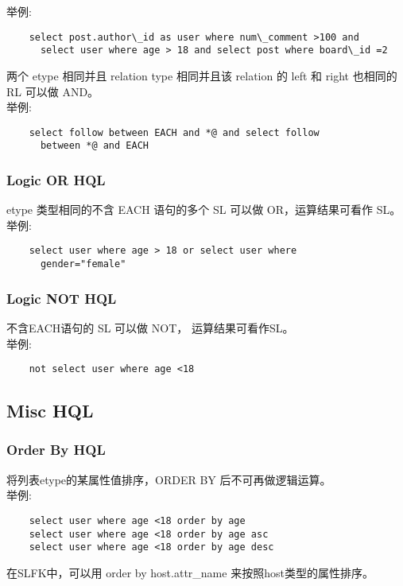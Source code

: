 \documentclass[10pt,a4paper]{article}
\begin{document}
\begin{CJK}{UTF8}{gbsn}
  举例:
\begin{verbatim}
    select post.author\_id as user where num\_comment >100 and
      select user where age > 18 and select post where board\_id =2
\end{verbatim}
  两个 etype 相同并且 relation type 相同并且该 relation 的 left 和 right 也相同的 RL 可以做 AND。\\

  举例:
\begin{verbatim}
    select follow between EACH and *@ and select follow
      between *@ and EACH
\end{verbatim}

  \subsubsection{Logic OR HQL}
  etype 类型相同的不含 EACH 语句的多个 SL 可以做 OR，运算结果可看作 SL。\\

  举例:
\begin{verbatim}
    select user where age > 18 or select user where
      gender="female"
\end{verbatim}

  \subsubsection{Logic NOT HQL}
  不含EACH语句的 SL 可以做 NOT， 运算结果可看作SL。\\

  举例:
\begin{verbatim}
    not select user where age <18
\end{verbatim}

  \subsection{Misc HQL}

  \subsubsection{Order By HQL}

  将列表etype的某属性值排序，ORDER BY 后不可再做逻辑运算。\\

  举例:

\begin{verbatim}
    select user where age <18 order by age
    select user where age <18 order by age asc
    select user where age <18 order by age desc
\end{verbatim}
  在SLFK中，可以用 order by host.attr\_name 来按照host类型的属性排序。


\end{CJK}
\end{document}
